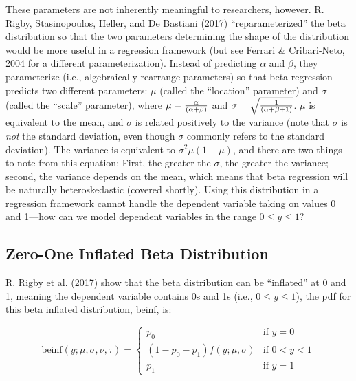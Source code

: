 \documentclass[english,man]{apa6}
\theoremstyle{definition}
\theoremstyle{definition}
\theoremstyle{remark}
\begin{document}
These parameters are not inherently meaningful to researchers, however.
R. Rigby, Stasinopoulos, Heller, and De Bastiani (2017)
\enquote{reparameterized} the beta distribution so that the two
parameters determining the shape of the distribution would be more
useful in a regression framework (but see Ferrari \& Cribari-Neto, 2004
for a different parameterization). Instead of predicting \(\alpha\) and
\(\beta\), they parameterize (i.e., algebraically rearrange parameters)
so that beta regression predicts two different parameters: \(\mu\)
(called the \enquote{location} parameter) and \(\sigma\) (called the
\enquote{scale} parameter), where \(\mu={\alpha\over(\alpha+\beta)}\)
and \(\sigma=\sqrt{1\over(\alpha+\beta+1)}\). \(\mu\) is equivalent to
the mean, and \(\sigma\) is related positively to the variance (note
that \(\sigma\) is \emph{not} the standard deviation, even though
\(\sigma\) commonly refers to the standard deviation). The variance is
equivalent to \(\sigma^2\mu(1-\mu)\), and there are two things to note
from this equation: First, the greater the \(\sigma\), the greater the
variance; second, the variance depends on the mean, which means that
beta regression will be naturally heteroskedastic (covered shortly).
Using this distribution in a regression framework cannot handle the
dependent variable taking on values 0 and 1---how can we model dependent
variables in the range \(0 \leq y \leq 1\)?

\subsection{Zero-One Inflated Beta
Distribution}\label{zero-one-inflated-beta-distribution}

R. Rigby et al. (2017) show that the beta distribution can be
\enquote{inflated} at 0 and 1, meaning the dependent variable contains
0s and 1s (i.e., \(0 \leq y \leq 1\)), the pdf for this beta inflated
distribution, \(\text{beinf}\), is:

\begin{center}
\[
\text{beinf}(y;\mu,\sigma,\nu,\tau) =
\begin{cases}
  p_0                             & \text{if } y = 0\\
  (1 - p_0 - p_1)f(y;\mu,\sigma)  & \text{if } 0 < y < 1\\
  p_1                             & \text{if } y = 1
\end{cases}
\]
\end{center}
\end{document}
